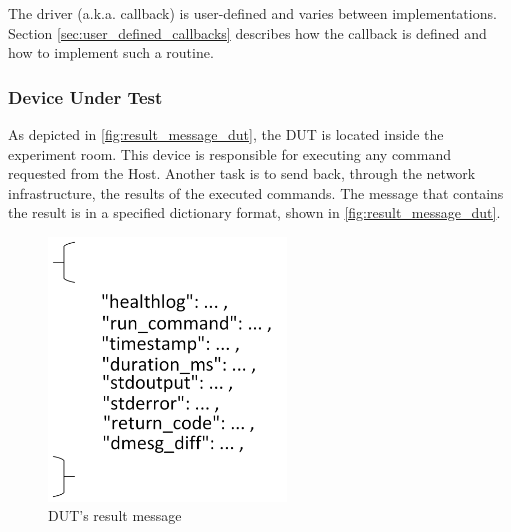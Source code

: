 The driver (a.k.a. callback) is user-defined and varies between implementations. Section \ref{sec:user_defined_callbacks} describes how the callback is defined and how to implement such a routine.

\subsubsection{Device Under Test}
As depicted in \autoref{fig:result_message_dut}, the DUT is located inside the experiment room. This device is responsible for executing any command requested from the Host. Another task is to send back, through the network infrastructure, the results of the executed commands. The message that contains the result is in a specified dictionary format, shown in \autoref{fig:result_message_dut}.

\begin{figure}[h]
\includegraphics[width=\textwidth, height=7cm,keepaspectratio]{images/result_message_dut.png}
\centering
\caption{DUT's result message}
\label{fig:result_message_dut}
\end{figure}
\newpage